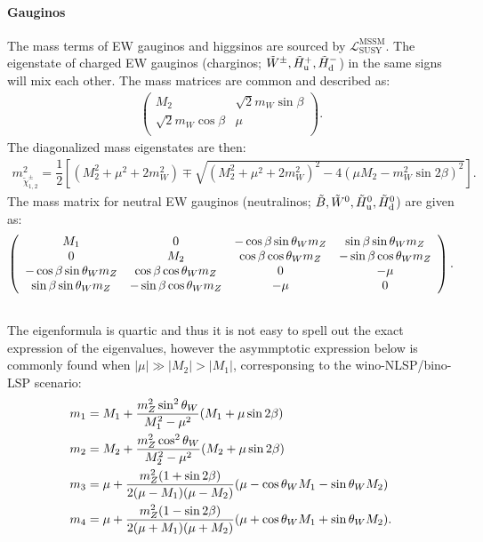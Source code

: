 \paragraph{Gauginos}
The mass terms of EW gauginos and higgsinos are sourced by $\mathcal{L}^{\mathrm{MSSM}}_{\mathrm{SUSY}}$. The eigenstate of charged EW gauginos (charginos; $\tilde{W}^\pm, \tilde{H}^+_{\mathrm{u}}, \tilde{H}^-_{\mathrm{d}}$) in the same signs will mix each other.
The mass matrices are common and described as:
\begin{align}
\left(  
  \begin{array}{cc}
    M_2                    &  \sqrt{2} m_W \sin{\beta} \\
    \sqrt{2} m_W \cos{\beta} &  \mu                    \\
  \end{array}
\right).
\end{align}
%
\noindent The diagonalized mass eigenstates are then:
\begin{align}
m_{\tilde{\chi}_{1,2}^{\pm}}^2 = \dfrac{1}{2} \left[ (M_2^2+\mu^2+2m_W^2) \mp \sqrt{(M_2^2+\mu^2+2m_W^2)^2 - 4(\mu M_2-m_W^2\sin2\beta)^2} \right].
\end{align}
%
\noindent The mass matrix for neutral EW gauginos (neutralinos; $\tilde{B}, \tilde{W}^0, \tilde{H}^0_{\mathrm{u}}, \tilde{H}^0_{\mathrm{d}}$) are given as:
\begin{align}
\left(  
  \begin{array}{cccc}
    M_1                       &  0                         & -\cos\beta\sin\theta_W m_Z &  \sin\beta\sin\theta_W m_Z   \\
    0                         &  M_2                       &  \cos\beta\cos\theta_W m_Z & -\sin\beta\cos\theta_W m_Z   \\
   -\cos\beta\sin\theta_W m_Z &  \cos\beta\cos\theta_W m_Z &  0                         & -\mu                         \\
    \sin\beta\sin\theta_W m_Z & -\sin\beta\cos\theta_W m_Z & -\mu                       &  0                           \\
  \end{array}
\right). \nonumber \\ \nonumber
\end{align}
The eigenformula is quartic and thus it is not easy to spell out the exact expression of the eigenvalues, 
however the asymmptotic expression below is commonly found when $|\mu| \gg |M_2| > |M_1| $, corresponsing to the wino-NLSP/bino-LSP scenario:
\begin{align}
m_1 & = M_1 + \frac{m_Z^2\sin^2{\theta_W}}{M_1^2-\mu^2} (M_1 + \mu\sin2\beta)   \nonumber \\
m_2 & = M_2 + \frac{m_Z^2\cos^2{\theta_W}}{M_2^2-\mu^2} (M_2 + \mu\sin2\beta)   \nonumber \\
m_3 & = \mu + \frac{m_Z^2(1+\sin{2\beta})}{2(\mu-M_1)(\mu-M_2)} (\mu-\cos{\theta_W}M_1-\sin{\theta_W}M_2)  \nonumber \\
m_4 & = \mu + \frac{m_Z^2(1-\sin{2\beta})}{2(\mu+M_1)(\mu+M_2)} (\mu+\cos{\theta_W}M_1+\sin{\theta_W}M_2).
\end{align}
